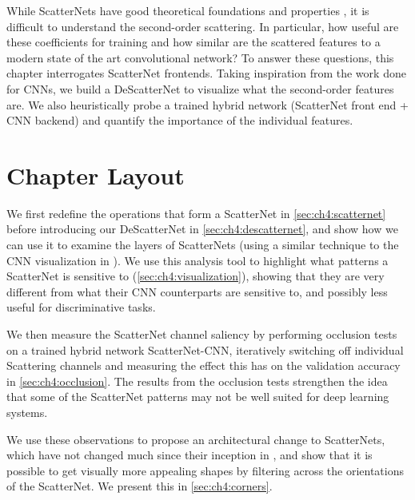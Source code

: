 While ScatterNets have good theoretical foundations and properties
\cite{mallat_group_2012}, it is difficult to understand the second-order
scattering. In particular, how useful are these coefficients for
training and how similar are the scattered features to a modern state of the art
convolutional network? To answer these questions, this chapter interrogates
ScatterNet frontends. Taking inspiration from the work done for
CNNs, we build a DeScatterNet to visualize what the second-order features are.
We also heuristically probe a trained hybrid network (ScatterNet front end + CNN
backend) and quantify the importance of the individual features.

\section{Chapter Layout}
We first redefine the operations that form a ScatterNet in
\autoref{sec:ch4:scatternet} before introducing our DeScatterNet in
\autoref{sec:ch4:descatternet}, and show how we can use it to examine the
layers of ScatterNets (using a similar technique to the CNN visualization in
\cite{zeiler_visualizing_2014}). We use this analysis tool to highlight what
patterns a ScatterNet is sensitive to (\autoref{sec:ch4:visualization}), showing
that they are very different from what their CNN counterparts are sensitive to,
and possibly less useful for discriminative tasks.

We then measure the ScatterNet channel saliency by performing occlusion tests
on a trained hybrid network ScatterNet-CNN, iteratively switching off individual
Scattering channels and measuring the effect this has on the validation accuracy
in \autoref{sec:ch4:occlusion}. The results from the occlusion tests strengthen
the idea that some of the ScatterNet patterns may not be well suited for deep
learning systems.

We use these observations to propose an architectural change to ScatterNets,
which have not changed much since their inception in \cite{mallat_group_2012},
and show that it is possible to get visually more appealing shapes by filtering
across the orientations of the ScatterNet. We present this in
\autoref{sec:ch4:corners}.
